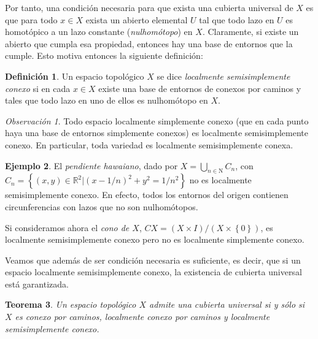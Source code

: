 \documentclass[12pt,a4paper]{book}
\newtheorem{thm}{Teorema}[section]
\theoremstyle{definition} \newtheorem{defn}[thm]{Definición}
\theoremstyle{definition} \newtheorem{ejemplo}[thm]{Ejemplo}
\theoremstyle{definition} \newtheorem{ejercicio}[thm]{Ejercicio}
\theoremstyle{remark} \newtheorem*{obs}{Observación}
\def\RR{\mathbb{R}}
\def\NN{\mathrm{N}}
\begin{document}
Por tanto, una condición necesaria para que exista una cubierta universal de $X$ es que para todo $x\in X$ exista un abierto elemental $U$ tal que todo lazo en $U$ es homotópico a un lazo constante (\emph{nulhomótopo}) en $X$. Claramente, si existe un abierto que cumpla esa propiedad, entonces hay una base de entornos que la cumple. Esto motiva entonces la siguiente definición:

\begin{defn}
  Un espacio topológico $X$ se dice \emph{localmente semisimplemente conexo} si en cada $x\in X$ existe una base de entornos de conexos por caminos y tales que todo lazo en uno de ellos es nulhomótopo en $X$.
\end{defn}

\begin{obs}
  Todo espacio localmente simplemente conexo (que en cada punto haya una base de entornos simplemente conexos) es localmente semisimplemente conexo. En particular, toda variedad es localmente semisimplemente conexa.
\end{obs}

\begin{ejemplo}
  El \emph{pendiente hawaiano}, dado por $X=\bigcup_{n\in \NN}C_n$, con $C_n=\left\{ (x,y)\in \RR^2 | (x-1/n)^2+y^2=1/n^2 \right\}$ no es localmente semisimplemente conexo. En efecto, todos los entornos del origen contienen circunferencias con lazos que no son nulhomótopos.

  Si consideramos ahora el \emph{cono de $X$}, $CX=(X\times I)/(X\times\left\{ 0 \right\})$, es localmente semisimplemente conexo pero no es localmente simplemente conexo.
\end{ejemplo}

Veamos que además de ser condición necesaria es suficiente, es decir, que si un espacio localmente semisimplemente conexo, la existencia de cubierta universal está garantizada.

\begin{thm}\label{cubuni}
  Un espacio topológico $X$ admite una cubierta universal si y sólo si $X$ es conexo por caminos, localmente conexo por caminos y localmente semisimplemente conexo.
\end{thm}
\end{document}
